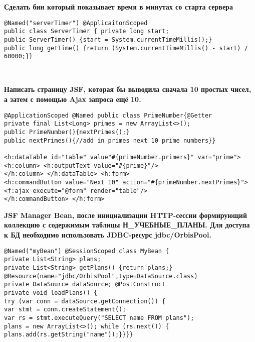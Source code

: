 \documentclass{article}
\begin{document}
\hfill
\begin{minipage}[t]{0.3\textwidth}
    \textbf{Сделать бин который показывает время в минутах со старта сервера}
    \begin{lstlisting}[frame=single, basicstyle=\tiny\ttfamily, breaklines=true, breakatwhitespace=true, postbreak=\mbox{\textcolor{red}{$\hookrightarrow$}\space}]
@Named("serverTimer") @ApplicaitonScoped
public class ServerTimer { private long start;
public ServerTimer() {start = System.currentTimeMillis();}
public long getTime() {return (System.currentTimeMillis() - start) / 60000;}}
    \end{lstlisting}
\end{minipage}%
\\ 

\begin{minipage}[t]{0.3\textwidth}
    \textbf{Написать страницу JSF, которая бы выводила сначала 10 простых чисел, а затем с помощью Ajax запроса ещё 10.}
    \begin{lstlisting}[frame=single, basicstyle=\tiny\ttfamily, breaklines=true, breakatwhitespace=true, postbreak=\mbox{\textcolor{red}{$\hookrightarrow$}\space}]
@ApplicationScoped @Named public class PrimeNumber{@Getter
private final List<Long> primes = new ArrayList<>();
public PrimeNumber(){nextPrimes();}
public nextPrimes(){//add in primes next 10 prime numbers}}

<h:dataTable id="table" value"#{primeNumber.primers}" var="prime">
<h:column> <h:outputText value="#{prime}"/>
</h:column> </h:dataTable> <h:form>
<h:commandButton value="Next 10" action="#{primeNumber.nextPrimes}">
<f:ajax execute="@form" render="table"/>
</h:commandButton> </h:form>
    \end{lstlisting}
\end{minipage}%
\hfill
\begin{minipage}[t]{0.3\textwidth}
    \textbf{JSF Manager Bean, после инициализации HTTP-сессии формирующий коллекцию с содержимым таблицы Н\_УЧЕБНЫЕ\_ПЛАНЫ. Для доступа к БД необходимо использовать JDBC-ресурс jdbc/OrbisPool.}
    \begin{lstlisting}[frame=single, basicstyle=\tiny\ttfamily, breaklines=true, breakatwhitespace=true, postbreak=\mbox{\textcolor{red}{$\hookrightarrow$}\space}]
@Named("myBean") @SessionScoped class MyBean {
private List<String> plans;
private List<String> getPlans() {return plans;}
@Resource(name="jdbc/OrbisPool",type=DataSource.class)
private DataSource dataSource; @PostConstruct
private void loadPlans() {
try (var conn = dataSource.getConnection()) {
var stmt = conn.createStatement();
var rs = stmt.executeQuery("SELECT name FROM plans");
plans = new ArrayList<>(); while (rs.next()) {
plans.add(rs.getString("name"));}}}}
    \end{lstlisting}
\end{minipage}%
\end{document}
